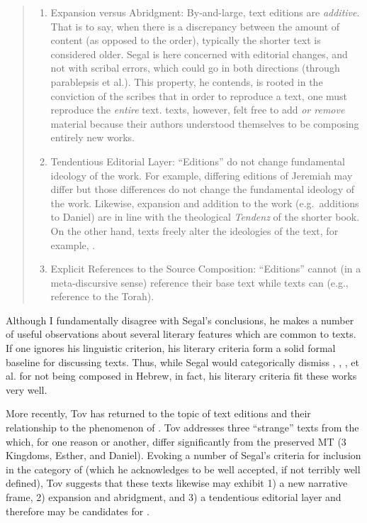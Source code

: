 \begin{quote}
\begin{enumerate}
    \item Expansion versus Abridgment: By-and-large, text editions are \emph{additive}. That is to say, when there is a discrepancy between the amount of content (as opposed to the order), typically the shorter text is considered older. Segal is here concerned with editorial changes, and not with scribal errors, which could go in both directions (through parablepsis et al.). This property, he contends, is rooted in the conviction of the scribes that in order to reproduce a text, one must reproduce the \emph{entire} text.%
        \autocite[24]{segal_henze2005}
    \rwb texts, however, felt free to add \emph{or remove} material because their authors understood themselves to be composing entirely new works.%
        \autocite[24]{segal_henze2005} 

    \item Tendentious Editorial Layer: ``Editions'' do not change fundamental ideology of the work. For example, differing editions of Jeremiah may differ but those differences do not change the fundamental ideology of the work. Likewise, expansion and addition to the work (e.g.~additions to Daniel) are in line with the theological \emph{Tendenz} of the shorter book. On the other hand, \rwb texts freely alter the ideologies of the text, for example, \jub.%
        \autocite[25]{segal_henze2005}

    \item Explicit References to the Source Composition: ``Editions'' cannot (in a meta-discursive sense) reference their base text while \rwb texts can (e.g., \jub reference to the Torah).
\end{enumerate} 
\end{quote} 
\noindent
Although I fundamentally disagree with Segal's conclusions, he makes a number of useful observations about several literary features which are common to \rwb texts. If one ignores his linguistic criterion, his literary criteria form a solid formal baseline for discussing \rwb texts. Thus, while Segal would categorically dismiss \ga, \ant, \lab, et al. for not being composed in Hebrew, in fact, his literary criteria fit these works very well.

More recently, Tov has returned to the topic of text editions and their relationship to the phenomenon of \rwb.%
    \autocite{tov_krarrer-kraus2008}
Tov addresses three ``strange'' texts from the \lxx which, for one reason or another, differ significantly from the preserved MT (3 Kingdoms, Esther, and Daniel). Evoking a number of Segal's criteria%
    \autocite{segal_henze2005}
for inclusion in the category of \rwb (which he acknowledges to be well accepted, if not terribly well defined), Tov suggests that these \lxx texts likewise may exhibit 1) a new narrative frame, 2) expansion and abridgment, and 3) a tendentious editorial layer and therefore may be candidates for \rwb. 

